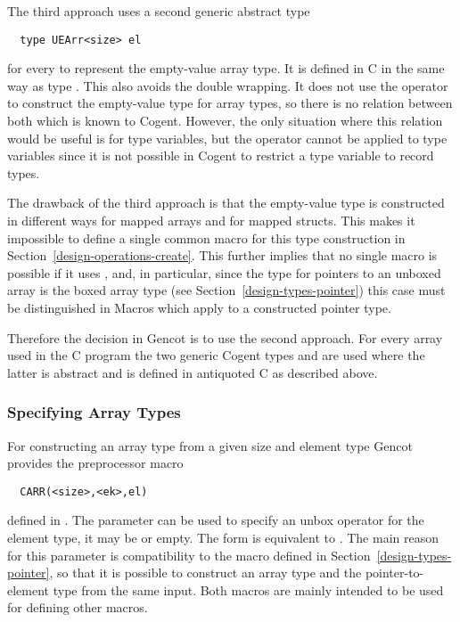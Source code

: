 The third approach uses a second generic abstract type 
\begin{verbatim}
  type UEArr<size> el
\end{verbatim}
for every  to represent the empty-value array type. It is defined in C in the same way as type .
This also avoids the double wrapping. It does not use the  operator to construct the empty-value type
for array types, so there is no relation between both which is known to Cogent. However, the only situation where this
relation would be useful is for type variables, but the  operator cannot be applied to type variables since
it is not possible in Cogent to restrict a type variable to record types. 

The drawback of the third approach is that the empty-value 
type is constructed in different ways for mapped arrays and for mapped structs. This makes it impossible to define 
a single common macro  for this type construction in Section~\ref{design-operations-create}. This further 
implies that no single macro is possible if it uses , and, in particular, since the type for pointers to
an unboxed array is the boxed array type (see Section~\ref{design-types-pointer}) this case must be distinguished 
in Macros which apply  to a constructed pointer type.

Therefore the decision in Gencot is to use the second approach. For every array  used in the C 
program the two generic Cogent types  and  are used where the latter is
abstract and is defined in antiquoted C as described above.

\subsubsection{Specifying Array Types}

For constructing an array type from a given size and element type Gencot provides the preprocessor macro
\begin{verbatim}
  CARR(<size>,<ek>,el)
\end{verbatim}
defined in . The parameter  can be used to specify an unbox
operator for the element type, it may be  or empty. The form  is equivalent
to . The main reason for this parameter is compatibility to the macro 
defined in Section~\ref{design-types-pointer}, so that it is possible to construct an array type and the 
pointer-to-element type from the same input. Both macros are mainly intended to be used for defining other
macros.

